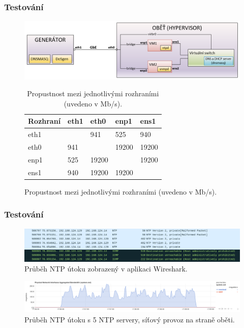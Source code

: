 \documentclass[%
12pt,       				%
t,                  %
aspectratio=1610,   %
unicode,						%
czech,              %
]{beamer}				    	%
\begin{document}
\begin{frame}
\frametitle{Testování}
	\begin{figure}%
	\centering
	\includegraphics[width=0.659\columnwidth]{obrazky/lab_schema.png}
	\caption{Schéma zapojení testovací sítě.}
	\begin{table}[ht]
		\centering
		\caption{Propustnost mezi jednotlivými rozhraními (uvedeno v Mb/s).}
		\label{tab:troughput-lab-interfaces}
	\begin{tabular}{|l|l|l|l|l|}
		\hline
		Rozhraní & eth1 & eth0  & enp1  & ens1  \\ \hline
		eth1     &      & 941   & 525   & 940   \\ \hline
		eth0     & 941  &       & 19200 & 19200 \\ \hline
		enp1     & 525  & 19200 &       & 19200 \\ \hline
		ens1     & 940  & 19200 & 19200 &       \\ \hline
	\end{tabular}
	\end{table}
	\end{figure}
\end{frame}


\begin{frame}
\frametitle{Testování}

\begin{figure}%
	\centering
	\vspace{0.4cm}	              %
	\includegraphics[width=0.99\columnwidth]{obrazky/mon_getlist_1_wireshark_with_icmp_and_reply.png}
	\caption{Průběh NTP útoku zobrazený v aplikaci Wireshark.}
\end{figure}

\begin{figure}%
	\centering
	\vspace{0.4cm}	              %
	\includegraphics[width=0.99\columnwidth]{obrazky/grafy/graph_ntp_traffic_5ampl.png}
	\caption{Průběh NTP útoku s 5 NTP servery, síťový provoz na straně oběti.}
\end{figure}
\end{frame}
\end{document}
